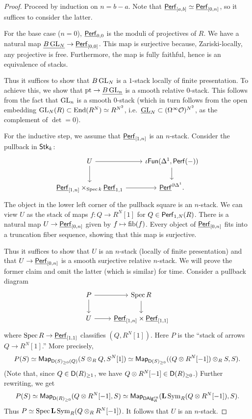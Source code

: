 \documentclass{amsart}
\begin{document}
\begin{proof}
	Proceed by induction on $n = b - a$.
	Note that $\underline{\mathsf{Perf}}_{[a,b]} \simeq \underline{\mathsf{Perf}}_{[0,n]}$, so it suffices to consider the latter.

	For the base case ($n = 0$), $\underline{\mathsf{Perf}}_{0,0}$ is the moduli of projectives of $R$.
	We have a natural map $\underline{B \operatorname{GL}_N} \to \underline{\mathsf{Perf}}_{[0,0]}$.
	This map is surjective because, Zariski-locally, any projective is free.
	Furthermore, the map is fully faithful, hence is an equivalence of stacks.

	Thus it suffices to show that $B \operatorname{GL}_N$ is a $1$-stack locally of finite presentation.
	To achieve this, we show that $\operatorname{pt} \to \underline{B \operatorname{GL}_n}$ is a smooth relative $0$-stack.
	This follows from the fact that $\operatorname{GL}_n$ is a smooth $0$-stack (which in turn follows from the open embedding $\operatorname{GL}_N(R) \subset \operatorname{End}(R^N) \simeq R^{N^2}$, i.e.\ $\underline{\operatorname{GL}}_N \subset (\Omega^\infty \mathcal{O})^{N^2}$, as the complement of $\det = 0$).

	For the inductive step, we assume that $\underline{\mathsf{Perf}}_{[1,n]}$ is an $n$-stack.
	Consider the pullback in $\mathsf{Stk}_k$:
	\[
		\begin{tikzcd}
			U \rar \dar & \iota \Fun(\Delta^1, \Perf(-)) \dar \\
			\ul{\Perf}_{[1,n]} \times_{\Spec k} \ul{\Perf}_{1,1} \rar & \ul{\Perf}^{\partial \Delta^1}.
		\end{tikzcd}
	\]
	The object in the lower left corner of the pullback square is an $n$-stack.
	We can view $U$ as the stack of maps $f: Q \to R^N[1]$ for $Q \in \mathsf{Perf}_{1,N}(R)$.
	There is a natural map $U \to \underline{\mathsf{Perf}}_{[0,n]}$ given by $f \mapsto \operatorname{fib}(f)$.
	Every object of $\underline{\mathsf{Perf}}_{[0,n]}$ fits into a truncation fiber sequence, showing that this map is surjective.

	Thus it suffices to show that $U$ is an $n$-stack (locally of finite presentation) and that $U \to \underline{\mathsf{Perf}}_{[0,n]}$ is a smooth surjective relative $n$-stack.
	We will prove the former claim and omit the latter (which is similar) for time.
	Consider a pullback diagram
	\[
		\begin{tikzcd}
			P \rar \dar & \Spec R \dar \\
			U \rar & \ul{\Perf}_{[1,n]} \times \ul{\Perf}_{[1,1]}
		\end{tikzcd}
	\]
	where $\operatorname{Spec} R \to \underline{\mathsf{Perf}}_{[1,1]}$ classifies $(Q, R^N[1])$.
	Here $P$ is the ``stack of arrows $Q \to R^N[1]$.''
	More precisely,
	\[
		P(S) \simeq \mathsf{Map}_{\mathsf{D}(S)_{\geq 0}(Q)}(S \otimes_R Q, S^N[1]) \simeq \mathsf{Map}_{\mathsf{D}(S)_{\geq 0}}((Q \otimes R^N[-1]) \otimes_R S, S).
	\]
	(Note that, since $Q \in \mathsf{D}(R)_{\geq 1}$, we have $Q \otimes R^N[-1] \in \mathsf{D}(R)_{\geq 0}$.)
	Further rewriting, we get
	\[
		P(S) \simeq \mathsf{Map}_{\mathsf{D}(R)_{\geq 0}}(Q \otimes R^N[-1], S) \simeq \mathsf{Map}_{\mathsf{DAlg}_R^{\mathrm{cn}}}(\mathbf{L} \operatorname{Sym}_R (Q \otimes R^N[-1]), S).
	\]
	Thus $P \simeq \operatorname{Spec} \mathbf{L} \operatorname{Sym}_R (Q \otimes_R R^N[-1])$.
	It follows that $U$ is an $n$-stack.


\end{proof}
\end{document}
